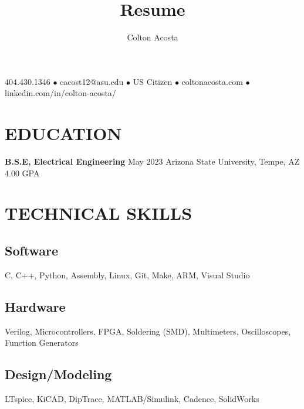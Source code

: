 \documentclass{article}
\makeatletter
\renewcommand{\maketitle}{
	\begin{center}
		{\huge\bfseries
			\theauthor}
			
		404.430.1346 $\bullet$ cacost12@asu.edu $\bullet$ US Citizen $\bullet$ coltonacosta.com $\bullet$ linkedin.com/in/colton-acosta/
	\end{center}
}
\makeatother
\begin{document}
\title{Resume}
\author{Colton Acosta}
\maketitle
\section{EDUCATION}
\textbf{B.S.E, Electrical Engineering}
\hfill 
May 2023
\linebreak
Arizona State University, Tempe, AZ 
\hfill
4.00 GPA

\section{TECHNICAL SKILLS}
\subsection{Software} 
C, C++, Python, Assembly, Linux, Git, Make, ARM, Visual Studio 
\subsection{Hardware}
Verilog, Microcontrollers, FPGA, Soldering (SMD), Multimeters, Oscilloscopes, Function Generators 
\subsection{Design/Modeling}
LTspice, KiCAD, DipTrace, MATLAB/Simulink, Cadence, SolidWorks
\end{document}
